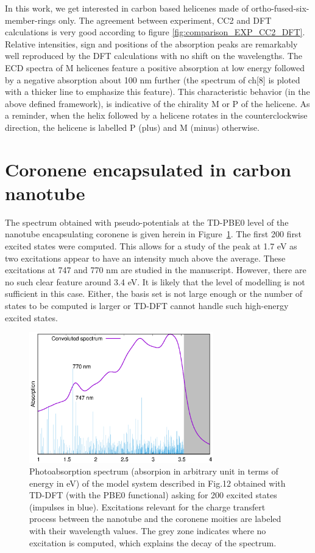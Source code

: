 \documentclass[aip]{revtex4-1}
\begin{document}
In this work, we get interested in carbon based helicenes made of
ortho-fused-six-member-rings only.
The agreement between experiment, CC2 and DFT calculations is very good according to
figure \ref{fig:comparison_EXP_CC2_DFT}.
Relative intensities, sign and positions of the absorption peaks are remarkably
well reproduced by the DFT calculations with no shift on the wavelengths.
The ECD spectra of M helicenes feature a positive absorption at low energy 
followed by a negative absorption about 100 nm further (the spectrum of ch[8]
is ploted with a thicker line to emphasize this feature).
This characteristic behavior (in the above defined framework), is indicative
of the chirality M or P of the helicene.
As a reminder, when the helix followed by a helicene rotates in the counterclockwise
direction, the helicene is labelled P (plus) and M (minus) otherwise.

\clearpage

\section*{Coronene encapsulated in carbon nanotube}

The spectrum obtained with pseudo-potentials at the TD-PBE0 level of the nanotube encapsulating coronene is given herein in Figure~\ref{fig:spectrum_nanotube}.
The first 200 first excited states were computed.
This allows for a study of the peak at 1.7 eV as two excitations appear to have an intensity much above the average.
These excitations at 747 and 770 nm are studied in the manuscript.
However, there are no such clear feature around 3.4 eV.
It is likely that the level of modelling is not sufficient in this case.
Either, the basis set is not large enough or the number of states to be computed is larger
or TD-DFT cannot handle such high-energy excited states.

\begin{figure}
\begin{center}
\includegraphics[width=8cm]{spectrum_w_impulses.eps}
\end{center}
\caption{\label{fig:spectrum_nanotube} 
Photoabsorption spectrum
(absorpion in arbitrary unit in terms of energy in eV)
of the model system described in Fig.12
obtained with TD-DFT (with the PBE0 functional) asking for 200
excited states (impulses in blue).
Excitations relevant for the charge transfert process between
the nanotube and the coronene moities are labeled with their wavelength values.
The grey zone indicates where no excitation is computed, which explains the
decay of the spectrum.
}
\end{figure}
\end{document}
